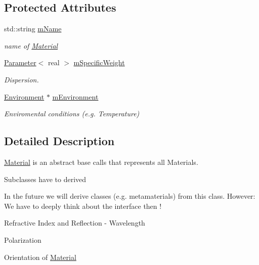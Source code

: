 \subsection*{Protected Attributes}
\begin{DoxyCompactItemize}
\item 
std\+::string \hyperlink{classMaterial_a4dc85b2e88aa30c51dda6a54f1bd2f30}{m\+Name}\hypertarget{classMaterial_a4dc85b2e88aa30c51dda6a54f1bd2f30}{}\label{classMaterial_a4dc85b2e88aa30c51dda6a54f1bd2f30}

\begin{DoxyCompactList}\small\item\em name of \hyperlink{classMaterial}{Material} \end{DoxyCompactList}\item 
\hyperlink{classParameter}{Parameter}$<$ real $>$ \hyperlink{classMaterial_a8d6bf3cf727dd81b4eac1726e0df36b0}{m\+Specific\+Weight}\hypertarget{classMaterial_a8d6bf3cf727dd81b4eac1726e0df36b0}{}\label{classMaterial_a8d6bf3cf727dd81b4eac1726e0df36b0}

\begin{DoxyCompactList}\small\item\em Dispersion. \end{DoxyCompactList}\item 
\hyperlink{classEnvironment}{Environment} $\ast$ \hyperlink{classMaterial_adb3c2440c55d8b32a19d9c246450179a}{m\+Environment}\hypertarget{classMaterial_adb3c2440c55d8b32a19d9c246450179a}{}\label{classMaterial_adb3c2440c55d8b32a19d9c246450179a}

\begin{DoxyCompactList}\small\item\em Enviromental conditions (e.\+g. Temperature) \end{DoxyCompactList}\end{DoxyCompactItemize}


\subsection{Detailed Description}
\hyperlink{classMaterial}{Material} is an abstract base calls that represents all Materials. 

Subclasses have to derived

In the future we will derive classes (e.\+g. metamaterials) from this class. However\+: We have to deeply think about the interface then !

Refractive Index and Reflection -\/ Wavelength
\begin{DoxyItemize}
\item Polarization
\item Orientation of \hyperlink{classMaterial}{Material}
\end{DoxyItemize}

